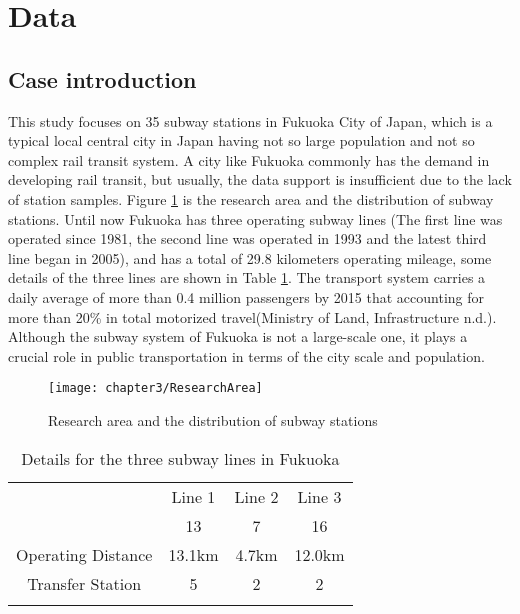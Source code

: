 \section{Data}
\subsection{Case introduction}
%
This study focuses on 35 subway stations in Fukuoka City of Japan, which is a typical local central city in Japan having not so large population and not so complex rail transit system. A city like Fukuoka commonly has the demand in developing rail transit, but usually, the data support is insufficient due to the lack of station samples. Figure \ref{fig:chp3:ResearchArea} is the research area and the distribution of subway stations. Until now Fukuoka has three operating subway lines (The first line was operated since 1981, the second line was operated in 1993 and the latest third line began in 2005), and has a total of 29.8 kilometers operating mileage, some details of the three lines are shown in Table \ref{tab:chp3:DetailsSubway}. The transport system carries a daily average of more than 0.4 million passengers by 2015 that accounting for more than 20\% in total motorized travel(Ministry of Land, Infrastructure n.d.). Although the subway system of Fukuoka is not a large-scale one, it plays a crucial role in public transportation in terms of the city scale and population.

\begin{figure}[htbp]
	\centering
	\texttt{[image: chapter3/ResearchArea]}
	\caption{Research area and the distribution of subway stations}
	\label{fig:chp3:ResearchArea}
	\small
	\renewcommand{\arraystretch}{1.25} %
\end{figure}

\begin{table}[htbp]
	\centering
	\caption{Details for the three subway lines in Fukuoka}
	\label{tab:chp3:DetailsSubway}%
	\small
	\renewcommand{\arraystretch}{1.25} %
	\begin{tabular}{cccc}
		\Xhline{1.5pt} %
		\diagbox[height=3em]{Item}{Lines} & Line 1 & Line 2 & Line 3\\ %
		\Xhline{0.5pt}
		
		\multicolumn{1}{c}{Total Stations}
		& 13 & 7 & 16\\
		\multicolumn{1}{c}{Operating Distance}
		& 13.1km & 4.7km & 12.0km \\
		\multicolumn{1}{c}{Transfer Station}
		& 5 & 2 & 2\\
		\Xhline{1.5pt}
	\end{tabular}
\end{table}

